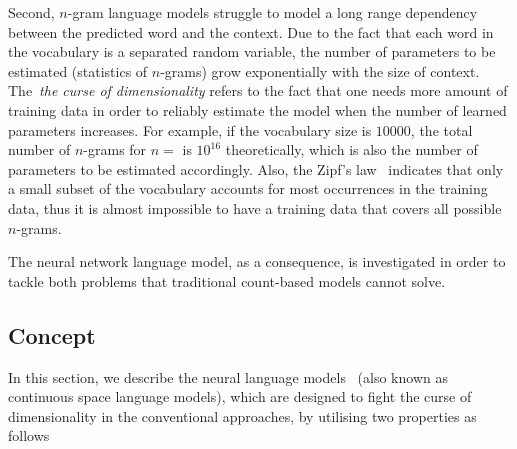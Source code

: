 Second, $n$-gram language models struggle to model a long range dependency between the predicted word and the context. Due to the fact that each word in the vocabulary is a separated random variable, the number of parameters to be estimated (statistics of $n$-grams) grow exponentially with the size of context. The~\textit{the curse of dimensionality} refers to the fact that one needs more amount of training data in order to reliably estimate the model when the number of learned parameters increases. For example, if the vocabulary size is $10000$, the total number of $n$-grams for $n=$ is $10^16$ theoretically, which is also the number of parameters to be estimated accordingly. Also, the Zipf's law~\cite{kingsley1932selective} indicates that only a small subset of the vocabulary accounts for most occurrences in the training data, thus it is almost impossible to have a training data that covers all possible $n$-grams. 

The neural network language model, as a consequence, is investigated in order to tackle both problems that traditional count-based models cannot solve. 




\subsection{Concept}
In this section, we describe the neural language models~\cite{bengio2006neural} (also known as continuous space language models), which are designed to fight the curse of dimensionality in the conventional approaches, by utilising two properties as follows

